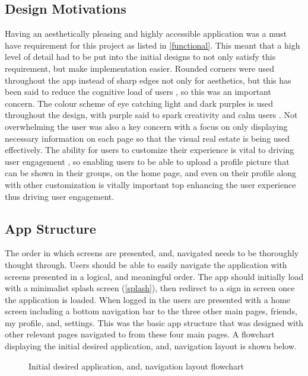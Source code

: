 \subsection*{Design Motivations}
Having an aesthetically pleasing and highly accessible application was a must have requirement for this project as listed in \ref{functional}. This meant that a high level of detail had to be put into the initial designs to not only satisfy this requirement, but make implementation easier. Rounded corners were used throughout the app instead of sharp edges not only for aesthetics, but this has been said to reduce the cognitive load of users \cite{roundedCorners}, so this was an important concern. The colour scheme of eye catching light and dark purples is used throughout the design, with purple said to spark creativity and calm users \cite{purplePsych}. Not overwhelming the user was also a key concern with a focus on only displaying necessary information on each page so that the visual real estate is being used effectively. The ability for users to customize their experience is vital to driving user engagement \cite{customUserEng}, so enabling users to be able to upload a profile picture that can be shown in their groups, on the home page, and even on their profile along with other customization is vitally important top enhancing the user experience thus driving user engagement. 

\subsection*{App Structure}
The order in which screens are presented, and, navigated needs to be thoroughly thought through. Users should be able to easily navigate the application with screens presented in a logical, and meaningful order. The app should initially load with a minimalist splash screen (\ref{splash}), then redirect to a sign in screen once the application is loaded. When logged in the users are presented with a home screen including a bottom navigation bar to the three other main pages, friends, my profile, and, settings. This was the basic app structure that was designed with other relevant pages navigated to from these four main pages. A flowchart displaying the initial desired application, and, navigation layout is shown below. 

\begin{figure}[!htbp]
    \centering
    \begin{subfigure}[b]{0.6\textwidth}
    \end{subfigure}
    \caption{Initial desired application, and, navigation layout flowchart} 
    \label{fig:layoutFlow}
\end{figure}
\FloatBarrier